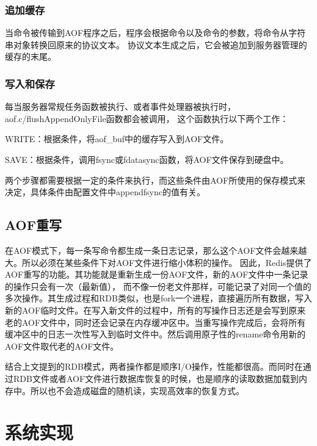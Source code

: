 \documentclass{zjutthesis}
\begin{document}
\subsection{追加缓存}
当命令被传输到AOF程序之后，程序会根据命令以及命令的参数，将命令从字符串对象转换回原来的协议文本。
协议文本生成之后，它会被追加到服务器管理的缓存的末尾。

\subsection{写入和保存}
每当服务器常规任务函数被执行、或者事件处理器被执行时，aof.c/flushAppendOnlyFile函数都会被调用，
这个函数执行以下两个工作：

WRITE：根据条件，将aof\_buf中的缓存写入到AOF文件。

SAVE：根据条件，调用fsync或fdatasync函数，将AOF文件保存到硬盘中。

两个步骤都需要根据一定的条件来执行，而这些条件由AOF所使用的保存模式来决定，具体条件由配置文件中appendfsync的值有关。

\section{AOF重写}
在AOF模式下，每一条写命令都生成一条日志记录，那么这个AOF文件会越来越大。所以必须在某些条件下对AOF文件进行缩小体积的操作。
因此，Redis提供了AOF重写的功能。其功能就是重新生成一份AOF文件，新的AOF文件中一条记录的操作只会有一次（最新值），
而不像一份老文件那样，可能记录了对同一个值的多次操作。其生成过程和RDB类似，也是fork一个进程，直接遍历所有数据，写入新的AOF临时文件。在写入新文件的过程中，所有的写操作日志还是会写到原来老的AOF文件中，同时还会记录在内存缓冲区中。当重写操作完成后，会将所有缓冲区中的日志一次性写入到临时文件中。然后调用原子性的rename命令用新的AOF文件取代老的AOF文件。

结合上文提到的RDB模式，两者操作都是顺序I/O操作，性能都很高。而同时在通过RDB文件或者AOF文件进行数据库恢复的时候，也是顺序的读取数据加载到内存中。所以也不会造成磁盘的随机读，实现高效率的恢复方式。


\chapter{系统实现}
\end{document}
